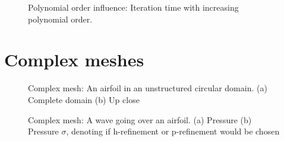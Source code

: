 \begin{figure}[H]
	\centering
	
	\caption{Polynomial order influence: Iteration time with increasing polynomial order.}
	\label{fig:N_influence}
\end{figure}

\section{Complex meshes} \label{section:results:complex_meshes}

\begin{figure}[H]
	\centering
	\hfill
	\caption{Complex mesh: An airfoil in an unstructured circular domain. (a) Complete domain (b) Up close}
	\label{fig:complex_mesh}
\end{figure}

\begin{figure}[H]
	\centering
	\hfill
	\caption{Complex mesh: A wave going over an airfoil. (a) Pressure (b) Pressure $\sigma$, denoting if h-refinement or p-refinement would be chosen}
	\label{fig:complex_mesh_solution}
\end{figure}
